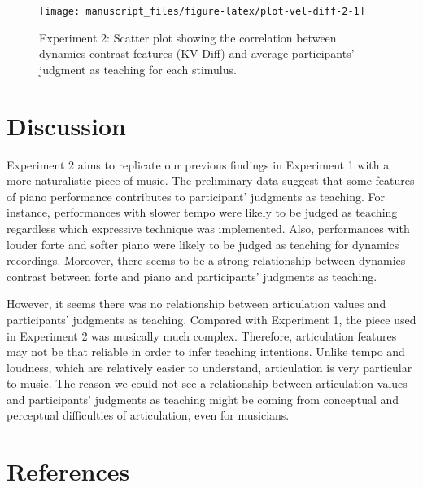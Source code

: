 \documentclass[
  man,floatsintext]{apa6}
\begin{document}
\begin{figure}

{\centering \texttt{[image: manuscript\_files/figure-latex/plot-vel-diff-2-1]} 

}

\caption{\label{fig:vel-diff-2}Experiment 2: Scatter plot showing the correlation between dynamics contrast features (KV-Diff) and average participants' judgment as teaching for each stimulus.}\label{fig:plot-vel-diff-2}
\end{figure}

\hypertarget{discussion-1}{%
\section{Discussion}\label{discussion-1}}

Experiment 2 aims to replicate our previous findings in Experiment 1 with a more naturalistic piece of music. The preliminary data suggest that some features of piano performance contributes to participant' judgments as teaching. For instance, performances with slower tempo were likely to be judged as teaching regardless which expressive technique was implemented. Also, performances with louder forte and softer piano were likely to be judged as teaching for dynamics recordings. Moreover, there seems to be a strong relationship between dynamics contrast between forte and piano and participants' judgments as teaching.

However, it seems there was no relationship between articulation values and participants' judgments as teaching. Compared with Experiment 1, the piece used in Experiment 2 was musically much complex. Therefore, articulation features may not be that reliable in order to infer teaching intentions. Unlike tempo and loudness, which are relatively easier to understand, articulation is very particular to music. The reason we could not see a relationship between articulation values and participants' judgments as teaching might be coming from conceptual and perceptual difficulties of articulation, even for musicians.

\newpage

\hypertarget{references}{%
\section{References}\label{references}}

\begingroup
\setlength{\parindent}{-0in}
\setlength{\leftskip}{0in}
\end{document}
